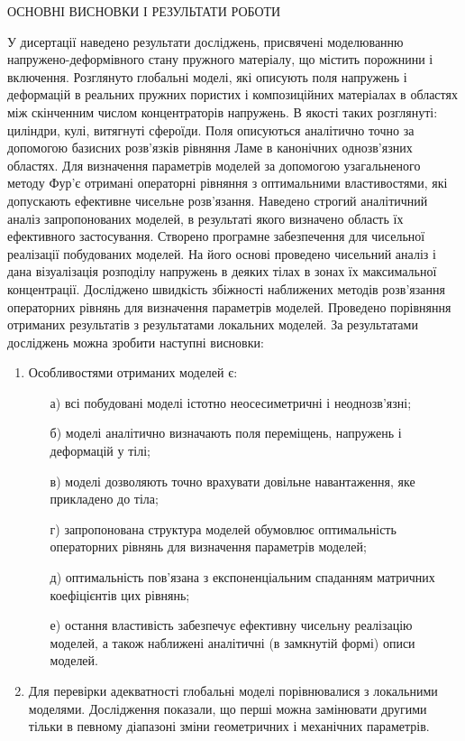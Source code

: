 \documentclass[book,14pt,small,oneside]{ncc}
\begin{document}
\begin{center}
ОСНОВНІ ВИСНОВКИ І РЕЗУЛЬТАТИ РОБОТИ
\end{center}

У дисертації наведено результати досліджень, присвячені моделюванню на\-пруже\-но-де\-формів\-но\-го стану пружного матеріалу, що містить порожнини і включення. Розглянуто глобальні моделі, які описують поля напружень і деформацій в реальних пружних пористих і композиційних матеріалах в областях між скінченним числом концентраторів напружень. В якості таких розглянуті: циліндри, кулі, витягнуті сфероїди. Поля описуються аналітично точно за допомогою базисних розв'язків рівняння Ламе в канонічних однозв'язних областях. Для визначення параметрів моделей за допомогою узагальненого методу Фур'є отримані операторні рівняння з оптимальними властивостями, які допускають ефективне чисельне розв'язання. Наведено строгий аналітичний аналіз запропонованих моделей, в результаті якого визначено область їх ефективного застосування. Створено програмне забезпечення для чисельної реалізації побудованих моделей. На його основі проведено чисельний аналіз і дана візуалізація розподілу напружень в деяких тілах в зонах їх максимальної концентрації. Досліджено швидкість збіжності наближених методів розв'язання операторних рівнянь для визначення параметрів моделей. Проведено порівняння отриманих результатів з результатами локальних моделей. За результатами досліджень можна зробити наступні висновки:

\begin{enumerate}
\item Особливостями отриманих моделей є:
\begin{itemize}
\item[а)] всі побудовані моделі істотно неосесиметричні і неоднозв'язні;
\item[б)] моделі аналітично визначають поля переміщень, напружень і деформацій у тілі;
\item[в)] моделі дозволяють точно врахувати довільне навантаження, яке прикладено до тіла;
\item[г)] запропонована структура моделей обумовлює оптимальність операторних рівнянь для визначення параметрів моделей;
\item[д)] оптимальність пов'язана з експоненціальним спаданням матричних коефіцієнтів цих рівнянь;
\item[е)] остання властивість забезпечує ефективну чисельну реалізацію моделей, а також наближені аналітичні (в замкнутій формі) описи моделей.
\end{itemize}
\item Для перевірки адекватності глобальні моделі порівнювалися з локальними моделями. Дослідження показали, що перші можна замінювати другими тільки в певному діапазоні зміни геометричних і механічних параметрів.
\end{enumerate}
\end{document}
